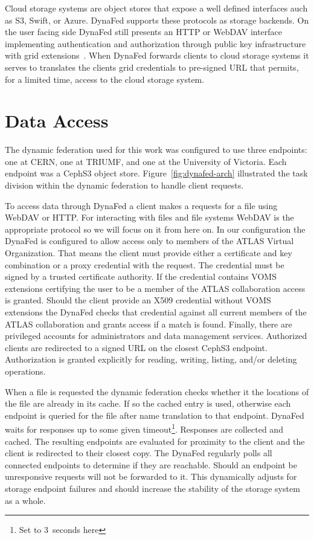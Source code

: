 \documentclass[a4paper]{jpconf}
\begin{document}
Cloud storage systems are object stores that expose a well defined interfaces auch as S3, Swift, or Azure. DynaFed supports these protocols as storage backends. On the user facing side DynaFed still presents an HTTP or WebDAV interface implementing authentication and authorization through public key infrastructure with grid extensions~\cite{voms}. When DynaFed forwards clients to cloud storage systems it serves to translates the clients grid credentials to pre-signed URL that permits, for a limited time, access to the cloud storage system.

\section{Data Access}
The dynamic federation used for this work was configured to use three endpoints: one at CERN, one at TRIUMF, and one at the University of Victoria. Each endpoint was a CephS3 object store. Figure~\ref{fig:dynafed-arch} illustrated the task division within the dynamic federation to handle client requests.

To access data through DynaFed a client makes a requests for a file using WebDAV or HTTP. For interacting with files and file systems WebDAV is the appropriate protocol so we will focus on it from here on. In our configuration the DynaFed is configured to allow access only to members of the ATLAS Virtual Organization. That means the client must provide either a certificate and key combination or a proxy credential with the request. The credential must be signed by a trusted certificate authority. If the credential contains VOMS extensions certifying the user to be a member of the ATLAS collaboration access is granted. Should the client provide an X509 credential without VOMS extensions the DynaFed checks that credential against all current members of the ATLAS collaboration and grants access if a match is found. Finally, there are privileged accounts for administrators and data management services. Authorized clients are redirected to a signed URL on the closest CephS3 endpoint. Authorization is granted explicitly for reading, writing, listing, and/or deleting operations.

When a file is requested the dynamic federation checks whether it the locations of the file are already in its cache. If so the cached entry is used, otherwise each endpoint is queried for the file after name translation to that endpoint. DynaFed waits for responses up to some given timeout\footnote{Set to 3~seconds here}. Responses are collected and cached. The resulting endpoints are evaluated for proximity to the client and the client is redirected to their closest copy. The DynaFed regularly polls all connected endpoints to determine if they are reachable. Should an endpoint be unresponsive requests will not be forwarded to it. This dynamically adjusts for storage endpoint failures and should increase the stability of the storage system as a whole.
\end{document}
